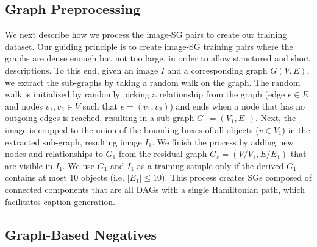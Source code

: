 \documentclass[11pt]{article}
\begin{document}
\subsection{Graph Preprocessing}
\label{supp:models:graph}

We next describe how we process the image-SG pairs to create our training dataset. Our guiding principle is to create image-SG training pairs where the graphs are dense enough but not too large, in order to allow structured and short descriptions. To this end, given an image $I$ and a corresponding graph $G(V,E)$, we extract the sub-graphs by taking a random walk on the graph. The random walk is initialized by randomly picking a relationship from the graph (edge $e \in E$ and nodes $v_1,v_2 \in V$ such that $e = (v_1,v_2)$) and ends when a node that has no outgoing edges is reached, resulting in a sub-graph $G_1 = (V_1,E_1)$. Next, the image is cropped to the union of the bounding boxes of all objects ($v \in V_1$) in the extracted sub-graph, resulting image $I_1$. We finish the process by adding new nodes and relationships to $G_1$ from the residual graph $G_r = (V/V_1,E/E_1)$ that are visible in $I_1$. We use $G_1$ and $I_1$ as a training sample only if the derived $G_1$ contains at most 10 objects (i.e. $|E_1| \leq 10$). This process creates SGs composed of connected components that are all DAGs with a single Hamiltonian path, which facilitates caption generation.

\subsection{Graph-Based Negatives} 
\label{supp:models:negatives}
\end{document}
